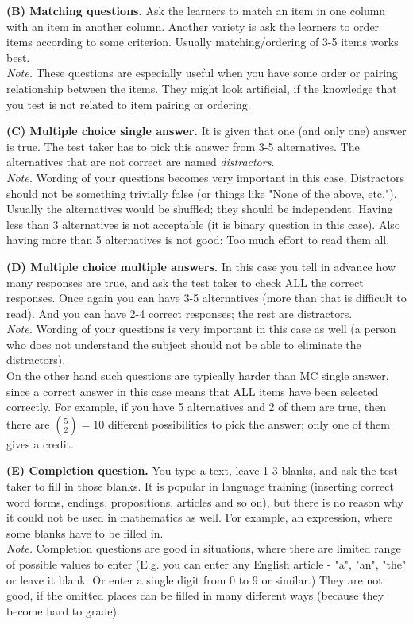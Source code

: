 \documentclass[jou]{apa6}
\begin{document}
\vspace{6pt}
{\bf (B) Matching questions.} Ask the learners to match an item in one column with an item in another column. 
Another variety is \textendash{} ask the learners to order items according to some criterion. 
Usually matching/ordering of 3-5 items works best.\\
{\em Note.} These questions are especially useful when you have some order or pairing relationship between the
items. They might look artificial, if the knowledge that you test is not related to item pairing or ordering.

\vspace{6pt}
{\bf (C) Multiple choice single answer.} It is given that one (and only one) answer is true. 
The test taker has to pick this answer from 3-5 alternatives. The alternatives that are not correct are 
named {\em distractors}.\\
{\em Note.} Wording of your questions becomes very important in this case. Distractors should not be 
something trivially false (or things like "None of the above, etc."). Usually the alternatives would 
be shuffled; they should be independent. Having less than 3 alternatives is not acceptable (it is binary question 
in this case). Also having more than 5 alternatives is not good: Too much effort to read them all.

\vspace{6pt}
{\bf (D) Multiple choice multiple answers.} In this case you tell in advance how many responses are true, and 
ask the test taker to check ALL the correct responses. Once again you can have 3-5 alternatives (more than that
is difficult to read). And you can have 2-4 correct responses; the rest are distractors.\\
{\em Note.} Wording of your questions is very important in this case as well (a person who does not
understand the subject should not be able to eliminate the distractors).\\
On the other hand such questions are typically harder than MC single answer, since 
a correct answer in this case means that ALL items have been selected correctly.
For example, if you have 5 alternatives and 2 of them are true, then there are ${\displaystyle {5 \choose 2} = 10}$
different possibilities to pick the answer; only one of them gives a credit.

\vspace{6pt}
{\bf (E) Completion question.} You type a text, leave 1-3 blanks, and ask the test taker to fill in those
blanks. It is popular in language training (inserting correct word forms, endings, propositions, articles and so on), 
but there is no reason why it could not be used in mathematics as well. For example, an expression, where some
blanks have to be filled in.\\
{\em Note.} Completion questions are good in situations, where there are limited range of possible values
to enter (E.g. you can enter any English article - "a", "an", "the" or leave it blank. Or enter a single digit from 0 to 9 
or similar.) They are not good, if the omitted places can be filled in many different ways (because they become 
hard to grade).
\end{document}
